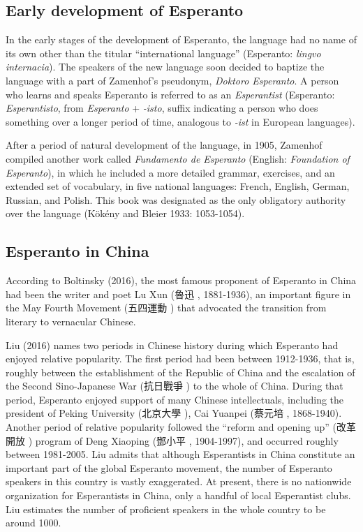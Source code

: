 \subsection{Early development of Esperanto}

In the early stages of the development of Esperanto, the language had no name of its own other than the titular ``international language'' (Esperanto: \textit{lingvo internacia}).
The speakers of the new language soon decided to baptize the language with a part of Zamenhof's pseudonym, \textit{Doktoro Esperanto}.
A person who learns and speaks Esperanto is referred to as an \textit{Esperantist} (Esperanto: \textit{Esperantisto}, from \textit{Esperanto} + \textit{-isto}, suffix indicating a person who does something over a longer period of time, analogous to \textit{-ist} in European languages).

After a period of natural development of the language, in 1905, Zamenhof compiled another work called \textit{Fundamento de Esperanto} (English: \textit{Foundation of Esperanto}), in which he included a more detailed grammar, exercises, and an extended set of vocabulary, in five national languages: French, English, German, Russian, and Polish.
This book was designated as the only obligatory authority over the language
(Kökény and Bleier 1933: 1053-1054).

\subsection{Esperanto in China}
According to Boltinsky (2016), the most famous proponent of Esperanto in China had been the writer and poet Lu Xun (魯迅 , 1881-1936), an important figure in the May Fourth Movement (五四運動 ) that advocated the transition from literary to vernacular Chinese.

Liu (2016) names two periods in Chinese history during which Esperanto had enjoyed relative popularity.
The first period had been between 1912-1936, that is, roughly between the establishment of the Republic of China and the escalation of the Second Sino-Japanese War (抗日戰爭 ) to the whole of China.
During that period, Esperanto enjoyed support of many Chinese intellectuals, including the president of Peking University (北京大學 ), Cai Yuanpei (蔡元培 , 1868-1940).
Another period of relative popularity followed the ``reform and opening up'' (改革開放 ) program of Deng Xiaoping (鄧小平 , 1904-1997), and occurred roughly between 1981-2005.
Liu admits that although Esperantists in China constitute an important part of the global Esperanto movement, the number of Esperanto speakers in this country is vastly exaggerated.
At present, there is no nationwide organization for Esperantists in China, only a handful of local Esperantist clubs.
Liu estimates the number of proficient speakers in the whole country to be around 1000.

